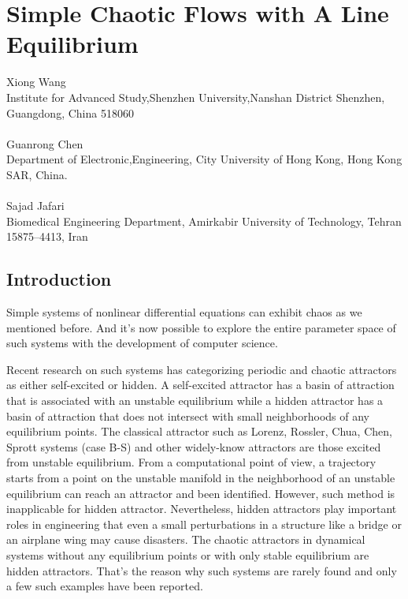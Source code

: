\chapter{Simple Chaotic Flows with A Line Equilibrium}
\label{chap:chaoslineequi}
\begin{pauthor}
  Xiong Wang\\
  Institute for Advanced Study,Shenzhen University,Nanshan District Shenzhen, Guangdong, China 518060\\
  \\
  Guanrong Chen\\
  Department of Electronic,Engineering, City University of Hong Kong, Hong Kong SAR, China.\\
  \\
  Sajad Jafari\\
  Biomedical Engineering Department, Amirkabir University of Technology, Tehran
  15875–4413, Iran\\
\end{pauthor}

\section{Introduction}

Simple systems of nonlinear differential equations can exhibit chaos as we mentioned before.
And it's now possible to explore the entire parameter space of such systems with the development
of computer science.

Recent research on such systems has categorizing periodic and chaotic attractors as either self-excited
or hidden\cite{Kuznetsov2010Analytical,Kuznetsov2011Hidden,Leonov2011,
  Leonov20112494,Leonov20112230,Leonov2011Hidden,Leonov2012Hidden,Leonov2013Analytical,
  Leonov2012IWCFTA2012}. 
A self-excited attractor has a basin of attraction that is associated with an unstable equilibrium while
a hidden attractor has a basin of attraction that does not intersect with small neighborhoods
of any equilibrium points.
The classical attractor such as Lorenz, Rossler, Chua, Chen, Sprott systems (case B-S) and other
widely-know attractors are those excited from unstable equilibrium. From a computational point of
view, a trajectory starts from a point on the unstable manifold in the neighborhood of an unstable
equilibrium can reach an attractor and been identified\cite{Leonov20112230}. However, such method
is inapplicable for hidden attractor. Nevertheless, hidden attractors play important roles in
engineering that even a small perturbations in a structure like a bridge or an airplane wing may cause disasters.
The chaotic attractors in dynamical systems without any equilibrium points or with only
stable equilibrium are hidden attractors. That's the reason why such systems are rarely
found and only a few such examples have been reported\cite{Jafari2013Elementary,MALIHE2013SIMPLE,Wang2011A,Wang2012Constructing,Wei2012Dynamical,Wang2012A,Wei2011Dynamical,Wang2012AB,Wei2012Delayed,Wei2010Anti}.


